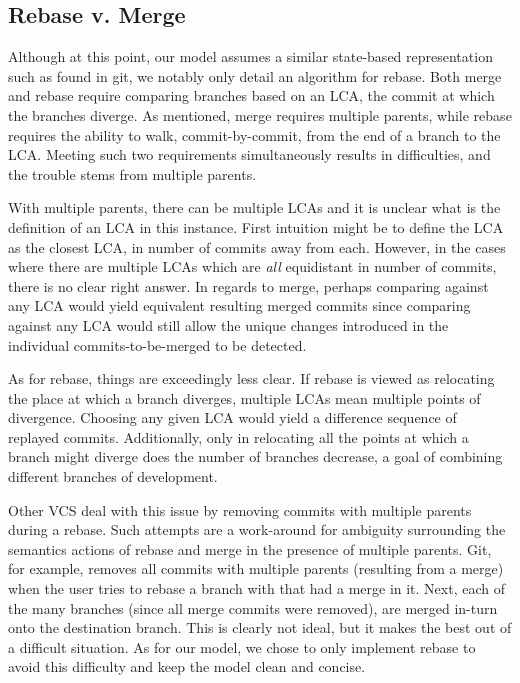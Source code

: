 \documentclass[]{article}
\begin{document}
\subsection{Rebase v. Merge}

Although at this point, our model assumes a similar state-based
representation such as found in git, we notably only detail an algorithm
for rebase. Both merge and rebase require comparing branches based on an
LCA, the commit at which the branches diverge. As mentioned, merge
requires multiple parents, while rebase requires the ability to walk,
commit-by-commit, from the end of a branch to the LCA. Meeting such two
requirements simultaneously results in difficulties, and the trouble
stems from multiple parents.

With multiple parents, there can be multiple LCAs and it is unclear what
is the definition of an LCA in this instance. First intuition might be
to define the LCA as the closest LCA, in number of commits away from
each. However, in the cases where there are multiple LCAs which are
\emph{all} equidistant in number of commits, there is no clear right
answer. In regards to merge, perhaps comparing against any LCA would
yield equivalent resulting merged commits since comparing against any
LCA would still allow the unique changes introduced in the individual
commits-to-be-merged to be detected.

As for rebase, things are exceedingly less clear. If rebase is viewed as
relocating the place at which a branch diverges, multiple LCAs mean
multiple points of divergence. Choosing any given LCA would yield a
difference sequence of replayed commits. Additionally, only in
relocating all the points at which a branch might diverge does the
number of branches decrease, a goal of combining different branches of
development.

Other VCS deal with this issue by removing commits with multiple parents
during a rebase. Such attempts are a work-around for ambiguity
surrounding the semantics actions of rebase and merge in the presence of
multiple parents. Git, for example, removes all commits with multiple
parents (resulting from a merge) when the user tries to rebase a branch
with that had a merge in it. Next, each of the many branches (since all
merge commits were removed), are merged in-turn onto the destination
branch. This is clearly not ideal, but it makes the best out of a
difficult situation. As for our model, we chose to only implement rebase
to avoid this difficulty and keep the model clean and concise.
\end{document}
